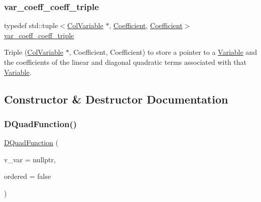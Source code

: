 \subsubsection{\texorpdfstring{var\+\_\+coeff\+\_\+coeff\+\_\+triple}{var\_coeff\_coeff\_triple}}
{\footnotesize\ttfamily typedef std\+::tuple$<$\mbox{\hyperlink{class_s_m_spp__di__unipi__it_1_1_col_variable}{Col\+Variable}} $\ast$, \mbox{\hyperlink{class_s_m_spp__di__unipi__it_1_1_d_quad_function_a1fa0f848dbb8d52dc62a1adfee1a1f90}{Coefficient}}, \mbox{\hyperlink{class_s_m_spp__di__unipi__it_1_1_d_quad_function_a1fa0f848dbb8d52dc62a1adfee1a1f90}{Coefficient}}$>$ \mbox{\hyperlink{class_s_m_spp__di__unipi__it_1_1_d_quad_function_a4da2c2c235cb90ba0e970725de950bf9}{var\+\_\+coeff\+\_\+coeff\+\_\+triple}}}

Triple (\mbox{\hyperlink{class_s_m_spp__di__unipi__it_1_1_col_variable}{Col\+Variable}} $\ast$, Coefficient, Coefficient) to store a pointer to a \mbox{\hyperlink{class_s_m_spp__di__unipi__it_1_1_variable}{Variable}} and the coefficients of the linear and diagonal quadratic terms associated with that \mbox{\hyperlink{class_s_m_spp__di__unipi__it_1_1_variable}{Variable}}. 

\subsection{Constructor \& Destructor Documentation}
\mbox{\label{class_s_m_spp__di__unipi__it_1_1_d_quad_function_a3843f68fee9919cf27f910700932fedd}} 
\subsubsection{\texorpdfstring{D\+Quad\+Function()}{DQuadFunction()}}
{\footnotesize\ttfamily \mbox{\hyperlink{class_s_m_spp__di__unipi__it_1_1_d_quad_function}{D\+Quad\+Function}} (\begin{DoxyParamCaption}\item[{\mbox{\hyperlink{class_s_m_spp__di__unipi__it_1_1_d_quad_function_adaced695e00a65836eb558a7bfbd85f4}{v\+\_\+var\+\_\+coeff\+\_\+coeff\+\_\+triple}} $\ast$}]{v\+\_\+var = {\ttfamily nullptr},  }\item[{const bool}]{ordered = {\ttfamily false} }\end{DoxyParamCaption})\hspace{0.3cm}{\ttfamily [inline]}}


